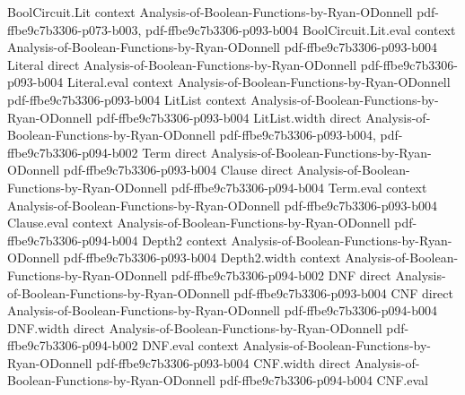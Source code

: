 \begin{lemma}
\label{BoolBLR.BLR_soundness_via_fourier_aux_hparseval}
\leanok
{}
\proofstep
  {BoolCircuit.Lit}
  {context}
  {Analysis-of-Boolean-Functions-by-Ryan-ODonnell}
  {pdf-ffbe9c7b3306-p073-b003,
    pdf-ffbe9c7b3306-p093-b004}
\proofstep
  {BoolCircuit.Lit.eval}
  {context}
  {Analysis-of-Boolean-Functions-by-Ryan-ODonnell}
  {pdf-ffbe9c7b3306-p093-b004}
\proofstep
  {Literal}
  {direct}
  {Analysis-of-Boolean-Functions-by-Ryan-ODonnell}
  {pdf-ffbe9c7b3306-p093-b004}
\proofstep
  {Literal.eval}
  {context}
  {Analysis-of-Boolean-Functions-by-Ryan-ODonnell}
  {pdf-ffbe9c7b3306-p093-b004}
\proofstep
  {LitList}
  {context}
  {Analysis-of-Boolean-Functions-by-Ryan-ODonnell}
  {pdf-ffbe9c7b3306-p093-b004}
\proofstep
  {LitList.width}
  {direct}
  {Analysis-of-Boolean-Functions-by-Ryan-ODonnell}
  {pdf-ffbe9c7b3306-p093-b004,
    pdf-ffbe9c7b3306-p094-b002}
\proofstep
  {Term}
  {direct}
  {Analysis-of-Boolean-Functions-by-Ryan-ODonnell}
  {pdf-ffbe9c7b3306-p093-b004}
\proofstep
  {Clause}
  {direct}
  {Analysis-of-Boolean-Functions-by-Ryan-ODonnell}
  {pdf-ffbe9c7b3306-p094-b004}
\proofstep
  {Term.eval}
  {context}
  {Analysis-of-Boolean-Functions-by-Ryan-ODonnell}
  {pdf-ffbe9c7b3306-p093-b004}
\proofstep
  {Clause.eval}
  {context}
  {Analysis-of-Boolean-Functions-by-Ryan-ODonnell}
  {pdf-ffbe9c7b3306-p094-b004}
\proofstep
  {Depth2}
  {context}
  {Analysis-of-Boolean-Functions-by-Ryan-ODonnell}
  {pdf-ffbe9c7b3306-p093-b004}
\proofstep
  {Depth2.width}
  {context}
  {Analysis-of-Boolean-Functions-by-Ryan-ODonnell}
  {pdf-ffbe9c7b3306-p094-b002}
\proofstep
  {DNF}
  {direct}
  {Analysis-of-Boolean-Functions-by-Ryan-ODonnell}
  {pdf-ffbe9c7b3306-p093-b004}
\proofstep
  {CNF}
  {direct}
  {Analysis-of-Boolean-Functions-by-Ryan-ODonnell}
  {pdf-ffbe9c7b3306-p094-b004}
\proofstep
  {DNF.width}
  {direct}
  {Analysis-of-Boolean-Functions-by-Ryan-ODonnell}
  {pdf-ffbe9c7b3306-p094-b002}
\proofstep
  {DNF.eval}
  {context}
  {Analysis-of-Boolean-Functions-by-Ryan-ODonnell}
  {pdf-ffbe9c7b3306-p093-b004}
\proofstep
  {CNF.width}
  {direct}
  {Analysis-of-Boolean-Functions-by-Ryan-ODonnell}
  {pdf-ffbe9c7b3306-p094-b004}
\proofstep
  {CNF.eval}

\end{lemma}
